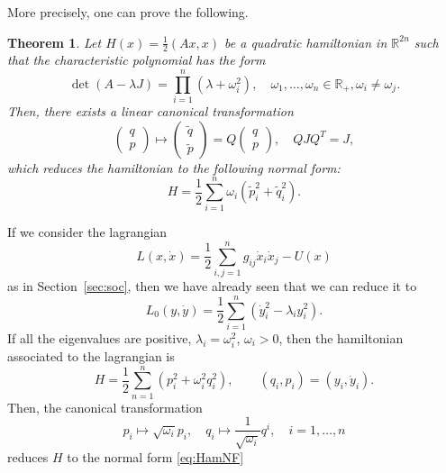 \documentclass[english,fontsize=11pt,paper=a5,oneside]{scrbook}
\newcommand{\R}{\mathbb{R}}
\newtheorem{theorem}{Theorem}[chapter]
\theoremstyle{definition}
\newenvironment{example}
  {\pushQED{\qed}\renewcommand{\qedsymbol}{$\lozenge$}\examplex}
  {\popQED\endexamplex}
\begin{document}
More precisely, one can prove the following.
\begin{theorem}
    Let $H(x) = \frac12(Ax,x)$ be a quadratic hamiltonian in $\R^{2n}$
    such that the characteristic polynomial has the form
    \begin{equation}
        \det(A-\lambda J) = \prod_{i=1}^n(\lambda + \omega_i^2), \quad \omega_1, \ldots, \omega_n \in \R_+, \omega_i\neq\omega_j.
    \end{equation}
    Then, there exists a linear canonical transformation
    \begin{equation}
        \begin{pmatrix}
            q \\ p
        \end{pmatrix}
        \mapsto
        \begin{pmatrix}
            \widetilde q \\ \widetilde p 
        \end{pmatrix}
        = Q
        \begin{pmatrix}
            q \\ p
        \end{pmatrix},
        \quad QJQ^T = J,
    \end{equation}
    which reduces the hamiltonian to the following \emph{normal form}:
    \begin{equation}\label{eq:HamNF}
        H = \frac12 \sum_{i=1}^n \omega_i(\widetilde p_i^2 + \widetilde q_i^2).
    \end{equation}
\end{theorem}

\begin{example}
    If we consider the lagrangian
\begin{equation}
    L(x,\dot x) = \frac12 \sum_{i,j=1}^n g_{ij}\dot x_i \dot x_j - U(x)
\end{equation}
as in Section~\ref{sec:soc}, then we have already seen that we can reduce it to
\begin{equation}
    L_0(y,\dot y) = \frac12 \sum_{i=1}^n(\dot y_i^2 - \lambda_i y_i^2).
\end{equation}
If all the eigenvalues are positive, $\lambda_i = \omega_i^2$, $\omega_i > 0$, then the hamiltonian associated to the lagrangian is
\begin{equation}
    H = \frac12 \sum_{n=1}^n(p_i^2 + \omega_i^2 q_i^2), \qquad (q_i, p_i) = (y_i, \dot y_i).
\end{equation}
Then, the canonical transformation
\begin{equation}
    p_i \mapsto \sqrt{\omega_i}p_i, \quad q_i \mapsto \frac{1}{\sqrt{\omega_i}}q^i, \quad i=1,\ldots,n
\end{equation}
reduces $H$ to the normal form \eqref{eq:HamNF}
\end{example}
\end{document}
